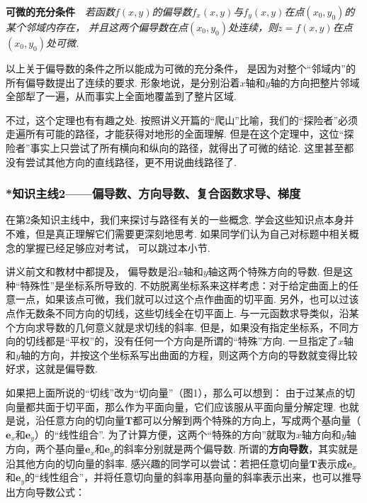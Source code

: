 \textbf{可微的充分条件}~~\textit{若函数$f(x,y)$的偏导数$f_{x}(x,y)$与$f_{y}(x,y)$在点$(x_0,y_0)$的某个邻域内存在，
并且这两个偏导数在点$(x_0,y_0)$处连续，则$z = f(x,y)$在点$(x_0,y_0)$处可微.}\par \vspace{0.5em}

以上关于偏导数的条件之所以能成为可微的充分条件，
是因为对整个“邻域内”的所有偏导数提出了连续的要求.
形象地说，是分别沿着$x$轴和$y$轴的方向把整片邻域全部犁了一遍，从而事实上全面地覆盖到了整片区域.\par
不过，这个定理也有有趣之处.
按照讲义开篇的“爬山”比喻，我们的“探险者”必须走遍所有可能的路径，才能获得对地形的全面理解.
但是在这个定理中，这位“探险者”事实上只尝试了所有横向和纵向的路径，就得出了可微的结论.
这里甚至都没有尝试其他方向的直线路径，更不用说曲线路径了.

\subsubsection{*知识主线2——偏导数、方向导数、复合函数求导、梯度} \par
在第2条知识主线中，我们来探讨与路径有关的一些概念.
学会这些知识点本身并不难，但是真正理解它们需要更深刻地思考.
如果同学们认为自己对标题中相关概念的掌握已经足够应对考试，
可以跳过本小节.

讲义前文和教材中都提及，
偏导数是沿$x$轴和$y$轴这两个特殊方向的导数.
但是这种“特殊性”是坐标系所导致的.
不妨脱离坐标系来这样考虑：对于给定曲面上的任意一点，如果该点可微，我们就可以过这个点作曲面的切平面.
另外，也可以过该点作无数条不同方向的切线，这些切线全在切平面上.
与一元函数求导类似，沿某个方向求导数的几何意义就是求切线的斜率.
但是，如果没有指定坐标系，不同方向的切线都是“平权”的，没有任何一个方向是所谓的“特殊”方向.
一旦指定了$x$轴和$y$轴的方向，并按这个坐标系写出曲面的方程，则这两个方向的导数就变得比较好求，这就是偏导数.\par

如果把上面所说的“切线”改为“切向量”（图1），那么可以想到：
由于过某点的切向量都共面于切平面，那么作为平面向量，它们应该服从平面向量分解定理.
也就是说，沿任意方向的切向量$\bm{T}$都可以分解到两个特殊的方向上，写成两个基向量（$\bm{e}_x$和$\bm{e}_y$）的“线性组合”.
为了计算方便，这两个“特殊的方向”就取为$x$轴方向和$y$轴方向，两个基向量$\bm{e}_x$和$\bm{e}_y$的斜率分别就是两个偏导数.
所谓的\textbf{方向导数}，其实就是沿其他方向的切向量的斜率.
感兴趣的同学可以尝试：若把任意切向量$\bm{T}$表示成$\bm{e}_x$和$\bm{e}_y$的“线性组合”，并将任意切向量的斜率用基向量的斜率表示出来，也可以推导出方向导数公式：\par


